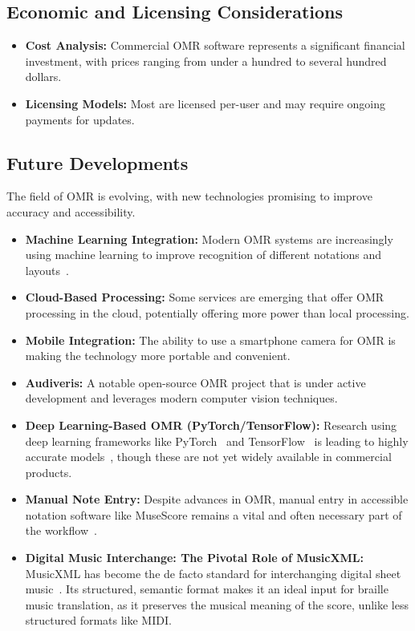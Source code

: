 \subsection{Economic and Licensing Considerations}\label{ch10:ssec:omr-economic-licensing}
\begin{itemize}
	\item \textbf{Cost Analysis:} Commercial \gls{OMR} software represents a significant financial investment, with prices ranging from under a hundred to several hundred dollars.
	\item \textbf{Licensing Models:} Most are licensed per-user and may require ongoing payments for updates.
\end{itemize}

\subsection{Future Developments}\label{ch10:ssec:omr-future-developments}
The field of \gls{OMR} is evolving, with new technologies promising to improve accuracy and accessibility.
\begin{itemize}
	\item \textbf{Machine Learning Integration:} Modern \gls{OMR} systems are increasingly using machine learning to improve recognition of different notations and layouts~\supercite{GaetanBaert-OMRdeep}.
	\item \textbf{Cloud-Based Processing:} Some services are emerging that offer \gls{OMR} processing in the cloud, potentially offering more power than local processing.
	\item \textbf{Mobile Integration:} The ability to use a smartphone camera for \gls{OMR} is making the technology more portable and convenient.
	\item \textbf{Audiveris:} A notable open-source \gls{OMR} project that is under active development and leverages modern computer vision techniques.
	\item \textbf{Deep Learning-Based OMR (PyTorch/TensorFlow):} Research using deep learning frameworks like PyTorch~\supercite{pytorch} and TensorFlow~\supercite{tensorflow} is leading to highly accurate models~\supercite{sachindae-polyphonic-omr}, though these are not yet widely available in commercial products.
	\item \textbf{Manual Note Entry:} Despite advances in \gls{OMR}, manual entry in accessible notation software like MuseScore remains a vital and often necessary part of the workflow~\supercite{musescore-accessibility}.
	\item \textbf{Digital Music Interchange: The Pivotal Role of MusicXML:} \gls{MusicXML} has become the de facto standard for interchanging digital sheet music~\supercite{daisy-musicxml}. Its structured, semantic format makes it an ideal input for braille music translation, as it preserves the musical meaning of the score, unlike less structured formats like MIDI.
\end{itemize}

